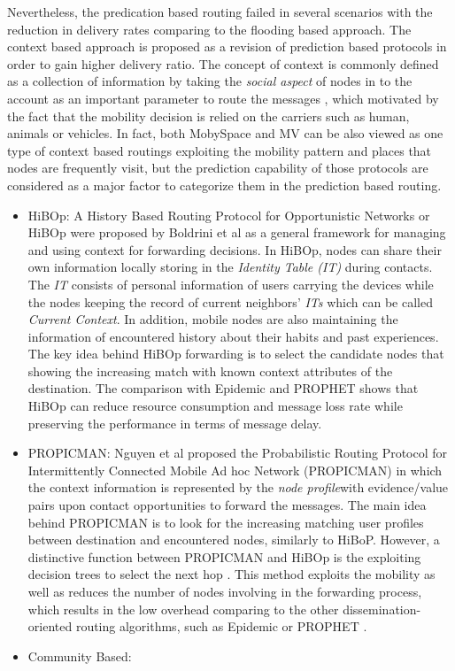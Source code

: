 Nevertheless, the predication based routing failed in several scenarios with the reduction in delivery rates comparing to the flooding based approach.
The context based approach is proposed as a revision of prediction based protocols in order to gain higher delivery ratio.
The concept of context is commonly defined as a collection of information by taking the \emph{social aspect} of nodes in to the account as an important parameter to route the messages \cite{Nguyen2009}, which motivated by the fact that the mobility decision is relied on the carriers such as human, animals or vehicles.
In fact, both MobySpace and MV can be also viewed as one type of context based routings exploiting the mobility pattern and places that nodes are frequently visit, but the prediction capability of those protocols are considered as a major factor to categorize them in the prediction based routing.

	\begin{itemize}
		\item HiBOp:
		A History Based Routing Protocol for Opportunistic Networks or HiBOp were proposed by Boldrini et al \cite{Boldrini2007} as a general framework for managing and using context for forwarding decisions.
		In HiBOp, nodes can share their own information locally storing in the \emph{Identity Table (IT)} during contacts.
		The \textit{IT} consists of personal information of users carrying the devices while the nodes keeping the record of current neighbors' \textit{ITs} which can be called \emph{Current Context}.
		In addition, mobile nodes are also maintaining the information of encountered history about their habits and past experiences.
		The key idea behind HiBOp forwarding is to select the candidate nodes that showing the increasing match with known context attributes of the destination.
		The comparison with Epidemic and PROPHET shows that HiBOp can reduce resource consumption and message loss rate while preserving the performance in terms of message delay.

		\item PROPICMAN:
		Nguyen et al \cite{Nguyen2007} proposed the Probabilistic Routing Protocol for Intermittently Connected Mobile Ad hoc Network (PROPICMAN) in which the context information is represented by the \emph{node profile}with evidence/value pairs upon contact opportunities to forward the messages. 
		The main idea behind PROPICMAN is to look for the increasing matching user profiles between destination and encountered nodes, similarly to HiBoP.
		However, a distinctive function between PROPICMAN and HiBOp is the exploiting decision trees to select the next hop \cite{Conti2010}.
		This method exploits the mobility as well as reduces the number of nodes involving in the forwarding process, which results in the low overhead comparing to the other dissemination-oriented routing algorithms, such as Epidemic or PROPHET \cite{isaac2013}. 


		\item Community Based:
		\cite{Mingjun2014}




	\end{itemize}

